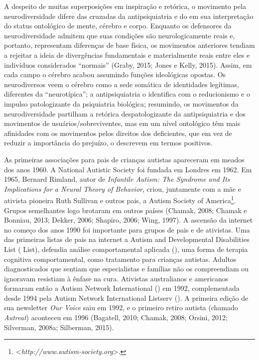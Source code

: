 A despeito de muitas superposições em inspiração e retórica, o movimento
pela neurodiversidade difere das cruzadas da antipsiquiatria e do 
em sua interpretação do status ontológico de mente, cérebro e corpo.
Enquanto os defensores da neurodiversidade admitem que suas condições
são neurologicamente reais e, portanto, representam diferenças de base
física, os movimentos anteriores tendiam a rejeitar a ideia de
divergências fundamentais e materialmente reais entre eles e indivíduos
considerados ``normais'' (Graby, 2015; Jones e Kelly, 2015). Assim, em
cada campo o cérebro acabou assumindo funções ideológicas opostas. Os
neurodiversos veem o cérebro como a sede somática de identidades
legítimas, diferentes da ``neurotípica''; a antipsiquiatria o identifica
com o reducionismo e o impulso patologizante da psiquiatria biológica;
resumindo, os movimentos da neurodiversidade partilham a retórica
despatologizante da antipsiquiatria e dos movimentos de
usuários/sobreviventes, mas em um nível ontológico têm mais afinidades
com os movimentos pelos direitos dos deficientes, que em vez de reduzir
a importância do prejuízo, o descrevem em termos positivos.

As primeiras associações para pais de crianças autistas apareceram em
meados dos anos 1960. A National Autistic Society foi fundada em Londres
em 1962. Em 1965, Bernard Rimland, autor de \emph{Infantile Autism: The
Syndrome and Its Implications for a Neural Theory of Behavior}, criou,
juntamente com a mãe e ativista pioneira Ruth Sullivan e outros pais, a
Autism Society of America\footnote[10]{\textless{}\emph{http://www.autism-society.org}\textgreater{}.}. Grupos semelhantes logo
brotaram em outros países (Chamak, 2008; Chamak e Bonniau, 2013; Dekker,
2006; Shapiro, 2006; Wing, 1997). A ascensão da internet no começo dos
anos 1990 foi importante para grupos de pais e de ativistas. Uma das
primeiras listas de pais na internet a Autism and Developmental
Disabilities List ( List), defendia análise comportamental
aplicada (), uma forma de terapia cognitiva comportamental, como
tratamento para crianças autistas. Adultos diagnosticados que sentiam
que especialistas e famílias não os compreendiam ou ignoravam resistiam
à ênfase na cura. Ativistas australianos e americanos formaram então a
Autism Network International () em 1992, complementada desde 1994
pela Autism Network International Listserv (). A primeira edição de
sua newsletter \emph{Our Voice} saiu em 1992, e o primeiro retiro
autista (chamado \emph{Autreat}) aconteceu em 1996 (Bagatell, 2010;
Chamak, 2008; Orsini, 2012; Silverman, 2008a; Silberman, 2015).

